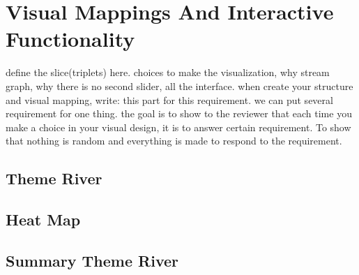 \chapter{Visual Mappings And Interactive Functionality}
define the slice(triplets) here. choices to make the visualization, why stream graph, why there is no second slider, all the interface.
when create your structure and visual mapping, write: this part for this requirement. we can put several requirement for one thing.
the goal is to show to the reviewer that each time
you make a choice in your visual design, it is to answer certain requirement. To show that nothing is random and everything is made to respond
to the requirement.
\section{Theme River}
\section{Heat Map}
\section{Summary Theme River}